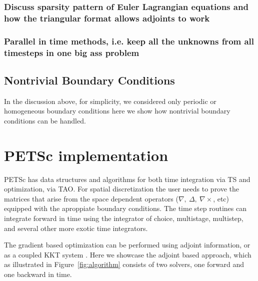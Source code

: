 \documentclass[10pt]{article}
\begin{document}
\subsubsection{Discuss sparsity pattern of Euler Lagrangian equations and how the triangular format allows adjoints to work}

\subsubsection{Parallel in time methods, i.e. keep all the unknowns from all timesteps in one big ass problem}

\subsection{Nontrivial Boundary Conditions}

In the discussion above, for simplicity, we considered only periodic or homogeneous boundary conditions here we show how nontrivial boundary conditions can be handled. 

\section{PETSc implementation}

PETSc has data structures and algorithms for both time integration via TS and optimization, via TAO.
For spatial discretization the user needs to prove the matrices that arise from the space dependent operators ($\nabla,\ \Delta,\ \nabla \times$, etc) equipped with the aproppiate boundary conditions. The time step routines can integrate forward in time using the integrator of choice, multistage, multistep, and several other more exotic time integrators.

The gradient based optimization can be performed using adjoint information, or as a coupled KKT system \cite{Haber_2007}. Here we showcase the adjoint based approach, which as illustrated in Figure~\ref{fig:algorithm} consists of two solvers, one forward and one backward in time.
\end{document}
